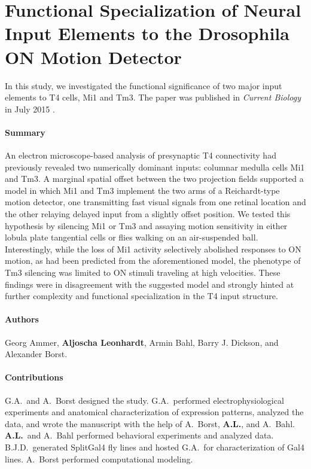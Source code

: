 \section{Functional Specialization of Neural Input Elements to the Drosophila ON Motion Detector}
\label{sct:manuscript_ammer}

In this study, we investigated the functional significance of two major input elements to T4 cells, Mi1 and Tm3. The paper was published in \textit{Current Biology} in July 2015 \citep{Ammer:2015jo}.

\paragraph{Summary}
An electron microscope-based analysis of presynaptic T4 connectivity had previously revealed two numerically dominant inputs: columnar medulla cells Mi1 and Tm3. A marginal spatial offset between the two projection fields supported a model in which Mi1 and Tm3 implement the two arms of a Reichardt-type motion detector, one transmitting fast visual signals from one retinal location and the other relaying delayed input from a slightly offset position. We tested this hypothesis by silencing Mi1 or Tm3 and assaying motion sensitivity in either lobula plate tangential cells or flies walking on an air-suspended ball. Interestingly, while the loss of Mi1 activity selectively abolished responses to ON motion, as had been predicted from the aforementioned model, the phenotype of Tm3 silencing was limited to ON stimuli traveling at high velocities. These findings were in disagreement with the suggested model and strongly hinted at further complexity and functional specialization in the T4 input structure.

\paragraph{Authors} Georg Ammer, \textbf{Aljoscha Leonhardt}, Armin Bahl, Barry J. Dickson, and Alexander Borst.

\paragraph{Contributions}
G.A.\ and A.\ Borst designed the study. G.A.\ performed electrophysiological experiments and anatomical characterization of expression patterns, analyzed the data, and wrote the manuscript with the help of A.\ Borst, \textbf{A.L.}, and A.\ Bahl. \textbf{A.L.}\ and A.\ Bahl performed behavioral experiments and analyzed data. B.J.D.\ generated SplitGal4 fly lines and hosted G.A.\ for characterization of Gal4 lines. A.\ Borst performed computational modeling.

\cleardoublepage

